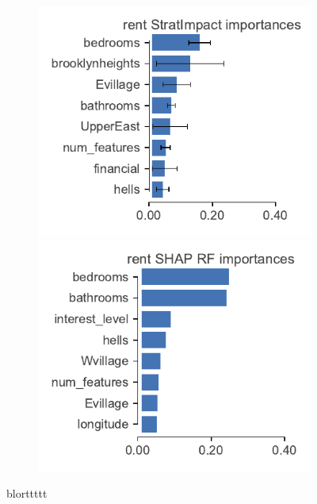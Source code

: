 \documentclass[11pt]{article}
\begin{document}
{\begin{figure}
\begin{subfigure}{1\textwidth}
\vspace{-2mm}\vspace{3mm}
\end{subfigure}%
\hfill
\begin{subfigure}{1\textwidth}
    \centering
\includegraphics[scale=0.5]{images/rent-features.pdf}
\includegraphics[scale=0.5]{images/rent-features-shap-rf.pdf}
\vspace{-2mm}\vspace{3mm}
\end{subfigure}
\caption[short]{blorttttt}
\label{fig:features}
\end{figure}
}


\end{document}

